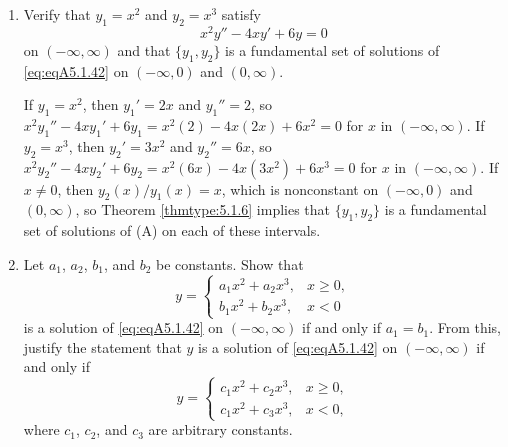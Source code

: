 \documentclass{ximera}
\begin{document}
\begin{problem}\label{exer:5.1.42}
\begin{enumerate}
\item %
Verify  that $y_1=x^2$ and $y_2=x^3$ satisfy
\begin{equation}\label{eq:eqA5.1.42}
x^2y''-4xy'+6y=0
\end{equation}
on $(-\infty,\infty)$ and that $\{y_1,y_2\}$ is a fundamental set of
solutions of \ref{eq:eqA5.1.42} on $(-\infty,0)$ and
$(0,\infty)$.

\begin{solution}
    If $y_1=x^2$, then $y_1'=2x$ and $y_1''=2$, so
$x^2y_1''-4xy_1'+6y_1=x^2(2)-4x(2x)+6x^2=0$
for $x$ in $(-\infty,\infty)$.
 If $y_2=x^3$, then $y_2'=3x^2$ and $y_2''=6x$, so
$x^2y_2''-4xy_2'+6y_2=x^2(6x)-4x(3x^2)+6x^3=0$
for $x$ in $(-\infty,\infty)$. If $x\ne0$, then $y_2(x)/y_1(x)=x$,
which is nonconstant on $(-\infty,0)$ and $(0,\infty)$, so
Theorem \ref{thmtype:5.1.6} implies that  $\{y_1,y_2\}$ is a fundamental
set of solutions of (A) on each of these intervals.
\end{solution}
\item %
Let $a_1$, $a_2$, $b_1$, and $b_2$ be constants. Show that
$$
y=\left\{\begin{array}{rr}
a_1x^2+a_2x^3,&x\ge 0,\\
b_1x^2+b_2x^3,&x<0\phantom{,}
\end{array}\right.
$$
is a solution of  \ref{eq:eqA5.1.42} on $(-\infty,\infty)$
if and only if $a_1=b_1$. From this, justify the statement that
$y$ is a  solution of \ref{eq:eqA5.1.42} on $(-\infty,\infty)$
if and only if
$$
y=\left\{\begin{array}{rr}
c_1x^2+c_2x^3,&x\ge 0,\\
c_1x^2+c_3x^3,&x<0,
\end{array}\right.
$$
where $c_1$, $c_2$, and $c_3$ are arbitrary constants.


\end{enumerate}
\end{problem}
\end{document}
